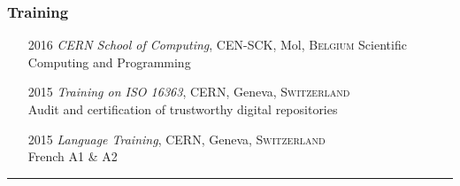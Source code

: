 \documentclass[12pt,a4paper]{article}
\newcommand{\colorrule}[1]
{
  {\color{#1}\hrule height 2pt}
  \vspace{1.0em}
}
\begin{document}
\subsubsection*{Training}
\begin{itemize}
	\item[2016] \emph{CERN School of Computing}, {CEN-SCK}, Mol,
		\textsc{Belgium}
  {\small Scientific Computing and Programming}
	\item[2015] \emph{Training on ISO 16363}, {CERN}, Geneva, \textsc{Switzerland}\\
	{\small Audit and certification of trustworthy digital repositories}
	\item[2015] \emph{Language Training}, {CERN}, Geneva, \textsc{Switzerland}\\
	{\small French A1 \& A2}
\end{itemize}

\colorrule{NavyBlue}
\end{document}
